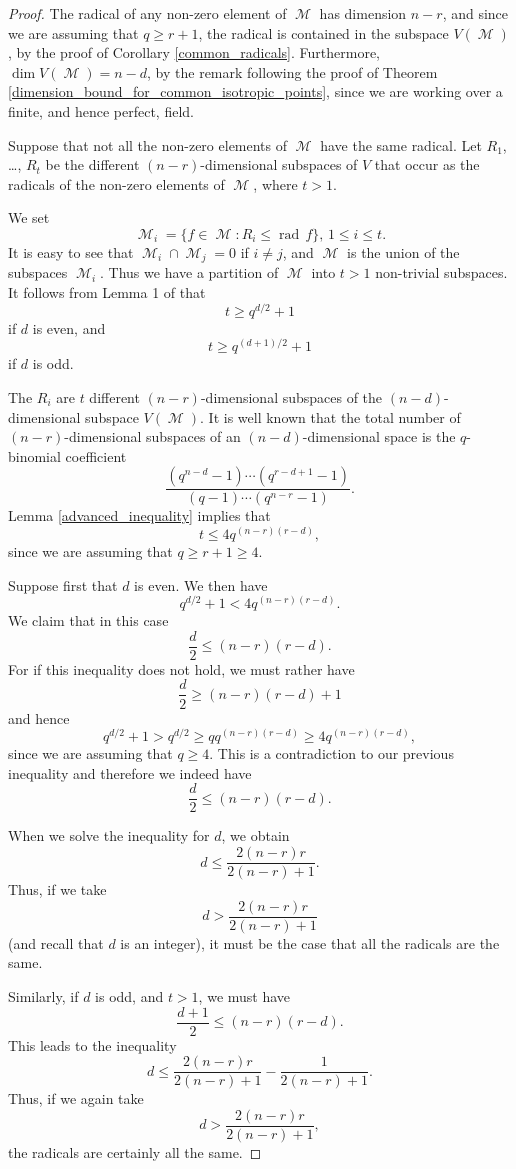 \documentclass{amsart}
\DeclareMathOperator{\M}{\mathcal{M}}
\DeclareMathOperator{\rad}{rad}
\theoremstyle{plain}
\theoremstyle{definition}
\begin{document}
\begin{proof}
 The radical of any non-zero element of $\M$ has dimension $n-r$, and since we are assuming that $q\geq r+1$, the radical is contained
 in the subspace $V(\M)$, by the proof of Corollary \ref{common_radicals}. Furthermore, $\dim V(\M)=n-d$, by the remark following
 the proof of Theorem \ref{dimension_bound_for_common_isotropic_points}, since we are working over a finite, and hence perfect, field.
 
 Suppose that
 not all the non-zero elements of $\M$ have the same radical. Let $R_1$, \dots, $R_t$ be the different
$(n-r)$-dimensional subspaces of $V$ that occur as the radicals of the non-zero elements of $\M$, where $t>1$. 

We set
\[
 \M_i=\{ f\in \M: R_i \leq \rad\,f\},\, 1\leq i\leq t.
\]
It is easy to see that $\M_i\cap \M_j=0$ if $i\neq j$, and $\M$ is the union of the subspaces $\M_i$. Thus we have a partition
of $\M$ into $t>1$ non-trivial subspaces. It follows from Lemma 1 of \cite{Gow2} that
\[
 t\geq q^{d/2}+1
\]
if $d$ is even, and
\[
 t\geq q^{(d+1)/2}+1
\]
if $d$ is odd. 

The $R_i$ are $t$ different $(n-r)$-dimensional subspaces of the $(n-d)$-dimensional subspace $V(\M)$. It is well known that the total number
of $(n-r)$-dimensional subspaces of an $(n-d)$-dimensional space is the $q$-binomial coefficient
\[
 \frac{(q^{n-d}-1)\cdots (q^{r-d+1}-1)}{(q-1)\cdots (q^{n-r}-1)}.
\]
Lemma \ref{advanced_inequality} implies that
\[
 t\leq 4q^{(n-r)(r-d)},
\]
since we are assuming that $q\geq r+1\geq 4$. 

Suppose first that $d$ is even. We then have
\[
 q^{d/2}+1<4q^{(n-r)(r-d)}.
\]
We claim that in this case
\[
 \frac{d}{2}\leq (n-r)(r-d).
\]
For if this inequality does not hold, we must rather have
\[
 \frac{d}{2}\geq (n-r)(r-d)+1
\]
and hence 
\[
 q^{d/2}+1>q^{d/2}\geq qq^{(n-r)(r-d)}\geq 4q^{(n-r)(r-d)},
\]
since we are assuming that $q\geq 4$. This is a contradiction to our previous inequality and therefore we indeed have
\[
 \frac{d}{2}\leq (n-r)(r-d).
\]

When we solve the inequality for $d$, we obtain
\[
 d\leq \frac{2(n-r)r}{2(n-r)+1}.
\]
Thus, if we take
\[
 d>\frac{2(n-r)r}{2(n-r)+1}
\]
(and recall that $d$ is an integer), it must be the case that all the radicals are the same.

Similarly, if $d$ is odd, and $t>1$, we must have
\[
  \frac{d+1}{2}\leq (n-r)(r-d).
\]
This leads to the inequality
\[
 d\leq \frac{2(n-r)r}{2(n-r)+1}-\frac{1}{2(n-r)+1}.
\]
Thus, if we again take
\[
 d>\frac{2(n-r)r}{2(n-r)+1},
\]
the radicals are certainly all the same.

\end{proof}
\end{document}
